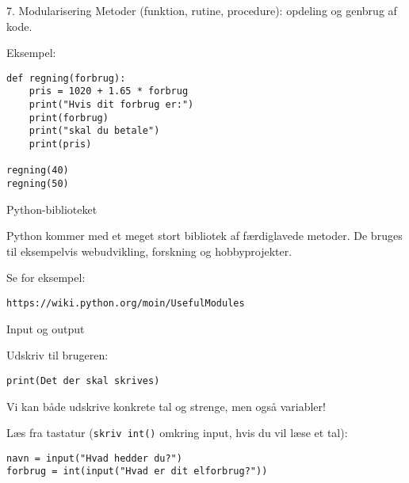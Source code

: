 \documentclass[10pt]{beamer}
\begin{document}

\begin{frame}[fragile]{7. Modularisering}
Metoder (funktion, rutine, procedure): \alert{opdeling} og \alert{genbrug} af kode.

\bigskip
Eksempel:

\begin{lstlisting}[style=python]
def regning(forbrug):
	pris = 1020 + 1.65 * forbrug
	print("Hvis dit forbrug er:")
	print(forbrug)
	print("skal du betale")
	print(pris)

regning(40)
regning(50)
\end{lstlisting}
\end{frame}


\begin{frame}{Python-biblioteket}

\bigskip

Python kommer med et meget stort bibliotek af færdiglavede metoder.
De bruges til eksempelvis webudvikling, forskning og hobbyprojekter.

\bigskip
Se for eksempel:

\begin{center}
	\texttt{https://wiki.python.org/moin/UsefulModules}
\end{center}
\end{frame}


\begin{frame}[fragile]{Input og output}

Udskriv til brugeren:

\begin{lstlisting}[style=python]
print(Det der skal skrives)
\end{lstlisting}
Vi kan både udskrive konkrete tal og strenge, men også variabler!

\bigskip

Læs fra tastatur (\texttt{skriv int()} omkring input, hvis du vil læse et tal):
\begin{lstlisting}[style=python]
navn = input("Hvad hedder du?")
forbrug = int(input("Hvad er dit elforbrug?"))
\end{lstlisting}
\end{frame}

\end{document}
